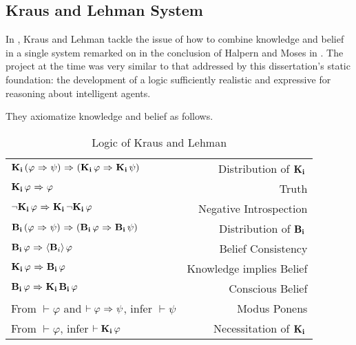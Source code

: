 \subsection{Kraus and Lehman System}
\label{sec:kl}

In \cite{KrausLehman}, Kraus and Lehman tackle the issue of how to combine knowledge and belief in a single system remarked on in the conclusion of Halpern and Moses in \cite{HalpernMoses}. The project at the time was very similar to that addressed by this dissertation's static foundation: the development of a logic sufficiently realistic and expressive for reasoning about intelligent agents. 

They axiomatize knowledge and belief as follows.

\begin{table}[H]
	\begin{center}
		\begin{tabular}{| l r |}
			\hline
			$\mathbf{K}_{\mathbf{i}}\,(\varphi {\ \Rightarrow \ } \psi) {\ \Rightarrow \ } (\mathbf{K}_{\mathbf{i}}\,\varphi {\ \Rightarrow \ } \mathbf{K}_{\mathbf{i}}\,\psi)$ & Distribution of $\mathbf{K}_{\mathbf{i}}\,$ \\
			$\mathbf{K}_{\mathbf{i}}\,\varphi {\ \Rightarrow \ } \varphi$ & Truth \\
			${\neg}\mathbf{K}_{\mathbf{i}}\,\varphi {\ \Rightarrow \ } \mathbf{K}_{\mathbf{i}}\,{\neg}\mathbf{K}_{\mathbf{i}}\,\varphi$ & Negative Introspection \\
			$\mathbf{B}_{\mathbf{i}}\,(\varphi {\ \Rightarrow \ } \psi) {\ \Rightarrow \ } (\mathbf{B}_{\mathbf{i}}\,\varphi {\ \Rightarrow \ } \mathbf{B}_{\mathbf{i}}\,\psi)$ & Distribution of $\mathbf{B}_{\mathbf{i}}\,$\\
			$\mathbf{B}_{\mathbf{i}}\,\varphi {\ \Rightarrow \ } \langle \mathbf{B}_{i} \rangle\,\varphi$ & Belief Consistency \\
			$\mathbf{K}_{\mathbf{i}}\,\varphi {\ \Rightarrow \ } \mathbf{B}_{\mathbf{i}}\,\varphi$ & Knowledge implies Belief \\
			$\mathbf{B}_{\mathbf{i}}\,\varphi {\ \Rightarrow \ } \mathbf{K}_{\mathbf{i}}\,\mathbf{B}_{\mathbf{i}}\,\varphi$ & Conscious Belief\\
			From $\vdash \varphi$ and $\vdash \varphi {\ \Rightarrow \ } \psi$, infer $\vdash\psi$ & Modus Ponens\\
			From $\vdash \varphi$, infer $\vdash \mathbf{K}_{\mathbf{i}}\,\varphi$ & Necessitation of $\mathbf{K}_{\mathbf{i}}\,$\\
			\hline
		\end{tabular}
		\caption{Logic of Kraus and Lehman}~\label{KL}
	\end{center}
\end{table}

